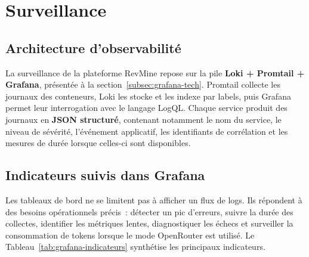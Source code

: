 \section{Surveillance}
\label{sec:surveillance}

\subsection{Architecture d'observabilité}

La surveillance de la plateforme RevMine repose sur la pile \textbf{Loki + Promtail + Grafana},
présentée à la section~\ref{subsec:grafana-tech}. Promtail collecte les journaux des conteneurs,
Loki les stocke et les indexe par labels, puis Grafana permet leur interrogation avec le langage
LogQL. Chaque service produit des journaux en \textbf{JSON structuré}, contenant notamment le nom
du service, le niveau de sévérité, l'événement applicatif, les identifiants de corrélation et les
mesures de durée lorsque celles-ci sont disponibles.

\subsection{Indicateurs suivis dans Grafana}

Les tableaux de bord ne se limitent pas à afficher un flux de logs. Ils répondent à des besoins
opérationnels précis~: détecter un pic d'erreurs, suivre la durée des collectes, identifier les
métriques lentes, diagnostiquer les échecs et surveiller la consommation de tokens lorsque le mode
OpenRouter est utilisé. Le Tableau~\ref{tab:grafana-indicateurs} synthétise les principaux
indicateurs.

